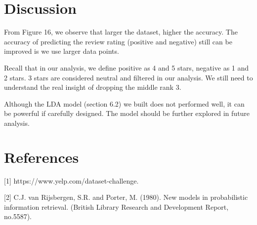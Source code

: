 \documentclass{article}
\begin{document}
\section{Discussion}
From Figure 16, we observe that larger the dataset, higher the accuracy. The accuracy of predicting the review rating (positive and negative) still can be improved is we use larger data points. 

Recall that in our analysis, we define positive as 4 and 5 stars, negative as 1 and 2 stars. 3 stars are considered neutral and filtered in our analysis. We still need to understand the real insight of dropping the middle rank 3. 

Although the LDA model (section 6.2) we built does not performed well, it can be powerful if carefully designed. The model should be further explored in future analysis.

\section*{References}
[1] https://www.yelp.com/dataset-challenge.

[2] C.J. van Rijsbergen, S.R. and Porter, M. (1980). New models in probabilistic information retrieval. (British Library Research and Development Report, no.5587).
\end{document}
